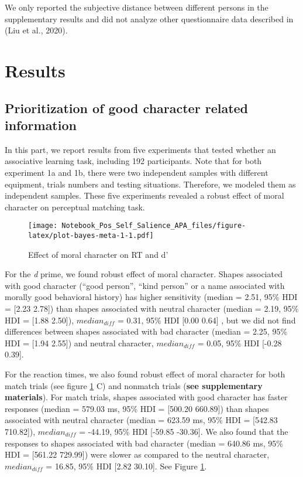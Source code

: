 \documentclass[
  man]{apa6}
\begin{document}
We only reported the subjective distance between different persons in the supplementary results and did not analyze other questionnaire data described in (Liu et al., 2020).

\hypertarget{results}{%
\section{Results}\label{results}}

\hypertarget{prioritization-of-good-character-related-information}{%
\subsection{Prioritization of good character related information}\label{prioritization-of-good-character-related-information}}

In this part, we report results from five experiments that tested whether an associative learning task, including 192 participants. Note that for both experiment 1a and 1b, there were two independent samples with different equipment, trials numbers and testing situations. Therefore, we modeled them as independent samples. These five experiments revealed a robust effect of moral character on perceptual matching task.

\begin{figure}
\centering
\texttt{[image: Notebook\_Pos\_Self\_Salience\_APA\_files/figure-latex/plot-bayes-meta-1-1.pdf]}
\caption{\label{fig:plot-bayes-meta-1}Effect of moral character on RT and d'}
\end{figure}

For the \emph{d} prime, we found robust effect of moral character. Shapes associated with good character (``good person'', ``kind person'' or a name associated with morally good behavioral history) has higher sensitivity (median = 2.51, 95\% HDI = {[}2.23 2.78{]}) than shapes associated with neutral character (median = 2.19, 95\% HDI = {[}1.88 2.50{]}), \(median_{diff}\) = 0.31, 95\% HDI {[}0.00 0.64{]} , but we did not find differences between shapes associated with bad character (median = 2.25, 95\% HDI = {[}1.94 2.55{]}) and neutral character, \(median_{diff}\) = 0.05, 95\% HDI {[}-0.28 0.39{]}.

For the reaction times, we also found robust effect of moral character for both match trials (see figure \ref{fig:plot-bayes-meta-1} C) and nonmatch trials (\textbf{see supplementary materials}). For match trials, shapes associated with good character has faster responses (median = 579.03 ms, 95\% HDI = {[}500.20 660.89{]}) than shapes associated with neutral character (median = 623.59 ms, 95\% HDI = {[}542.83 710.82{]}), \(median_{diff}\) = -44.19, 95\% HDI {[}-59.85 -30.36{]}. We also found that the responses to shapes associated with bad character (median = 640.86 ms, 95\% HDI = {[}561.22 729.99{]}) were slower as compared to the neutral character, \(median_{diff}\) = 16.85, 95\% HDI {[}2.82 30.10{]}. See Figure \ref{fig:plot-bayes-meta-1}.
\end{document}
